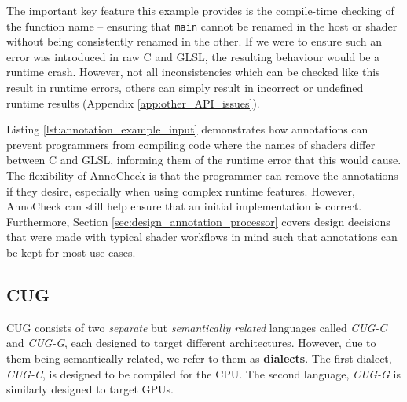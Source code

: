 \documentclass[a4paper,12pt,twoside,openright]{report}
\begin{document}

The important key feature this example provides is the compile-time checking of
the function name -- ensuring that \texttt{main} cannot be renamed in the host
or shader without being consistently renamed in the other. If we were to ensure
such an error was introduced in raw C and GLSL, the resulting behaviour would
be a runtime crash. However, not all inconsistencies which can be checked like
this result in runtime errors, others can simply result in incorrect or
undefined runtime results (Appendix \ref{app:other_API_issues}).

Listing \ref{lst:annotation_example_input} demonstrates how annotations can
prevent programmers from compiling code where the names of shaders differ
between C and GLSL, informing them of the runtime error that this would cause.
The flexibility of AnnoCheck is that the programmer can remove the annotations
if they desire, especially when using complex runtime features. However,
AnnoCheck can still help ensure that an initial implementation is correct.
Furthermore, Section \ref{sec:design_annotation_processor} covers design
decisions that were made with typical shader workflows in mind such that
annotations can be kept for most use-cases.

\subsection{CUG}

CUG consists of two \textit{separate} but \textit{semantically related}
languages called \textit{CUG-C} and \textit{CUG-G}, each designed to target
different architectures. However, due to them being semantically related, we
refer to them as \textbf{dialects}. The first dialect, \textit{CUG-C}, is
designed to be compiled for the CPU. The second language, \textit{CUG-G} is
similarly designed to target GPUs.

\end{document}

